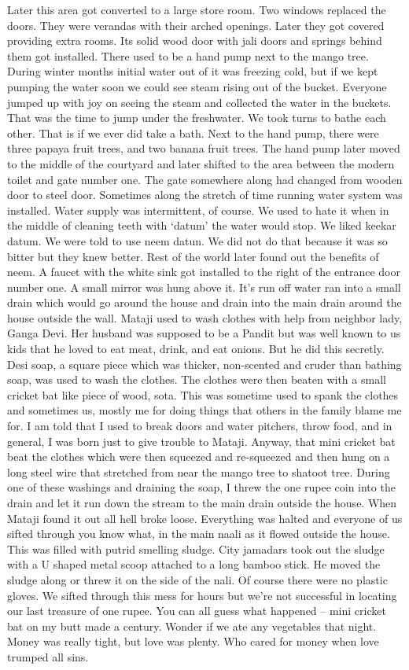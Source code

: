 Later this area got converted to a large store room. Two windows replaced the doors. 
They were verandas with their arched openings. Later they got covered providing extra rooms. Its solid wood door with jali doors and springs behind them got installed. There used to be a hand pump next to the mango tree. During winter months initial water out of it was freezing cold, but if we kept pumping the water soon we could see steam rising out of the bucket. Everyone jumped up with joy on seeing the steam and collected the water in the buckets. That was the time to jump under the freshwater. We took turns to bathe each other. That is if we ever did take a bath. Next to the hand pump, there were three papaya fruit trees, and two banana fruit trees. The hand pump later moved to the middle of the courtyard and later shifted to the area between the modern toilet and gate number one. The gate somewhere along had changed from wooden door to steel door. Sometimes along the stretch of time running water system was installed. Water supply was intermittent, of course. We used to hate it when in the middle of cleaning teeth with ‘datum’ the water would stop. We liked keekar datum. We were told to use neem datun. We did not do that because it was so bitter but they knew better. Rest of the world later found out the benefits of neem. A faucet with the white sink got installed to the right of the entrance door number one. A small mirror was hung above it. It’s run off water ran into a small drain which would go around the house and drain into the main drain around the house outside the wall. Mataji used to wash clothes with help from neighbor lady, Ganga Devi. Her husband was supposed to be a Pandit but was well known to us kids that he loved to eat meat, drink, and eat onions. But he did this secretly. Desi soap, a square piece which was thicker, non-scented and cruder than bathing soap, was used to wash the clothes. The clothes were then beaten with a small cricket bat like piece of wood, sota. This was sometime used to spank the clothes and sometimes us, mostly me for doing things that others in the family blame me for. I am told that I used to break doors and water pitchers, throw food, and in general, I was born just to give trouble to Mataji. Anyway, that mini cricket bat beat the clothes which were then squeezed and re-squeezed and then hung on a long steel wire that stretched from near the mango tree to shatoot tree. During one of these washings and draining the soap, I threw the one rupee coin into the drain and let it run down the stream to the main drain outside the house. When Mataji found it out all hell broke loose. Everything was halted and everyone of us sifted through you know what, in the main naali as it flowed outside the house. This was filled with putrid smelling sludge. City jamadars took out the sludge with a U shaped metal scoop attached to a long bamboo stick. He moved the sludge along or threw it on the side of the nali. Of course there were no plastic gloves. We sifted through this mess for hours but we’re not successful in locating our last treasure of one rupee. You can all guess what happened – mini cricket bat on my butt made a century. Wonder if we ate any vegetables that night. Money was really tight, but love was plenty. Who cared for money when love trumped all sins. 

